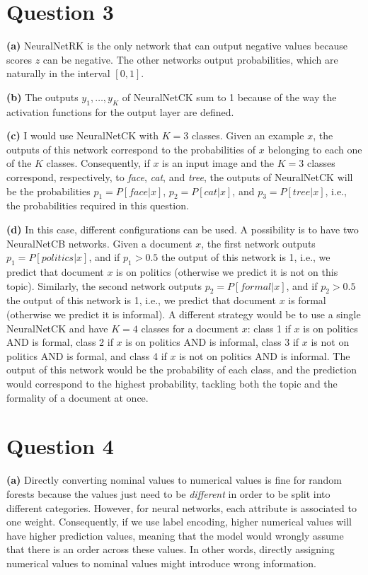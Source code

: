 \documentclass[leqno]{article}
\begin{document}
\hfill
\section*{Question 3} \textbf{(a)} NeuralNetRK is the only network that can output negative values because scores $z$ can be negative. The other 
networks output probabilities, which are naturally in the interval $[0,1]$.

\hfill

\noindent \textbf{(b)} The outputs $y_1, \ldots, y_K$ of NeuralNetCK sum to 1 because of the way the activation functions for the output layer are defined. 

\hfill

\noindent \textbf{(c)} I would use NeuralNetCK with $K = 3$ classes. Given an example $x$, the outputs of this network correspond to the probabilities of $x$ belonging to 
 each one of the $K$ classes. Consequently, if $x$ is an input image and the $K = 3$ classes correspond, respectively, to \textit{face}, \textit{cat}, and \textit{tree}, the 
outputs of NeuralNetCK will be the probabilities $p_1 = P[face|x]$, $p_2 = P[cat|x]$, and $p_3 = P[tree|x]$, i.e., the probabilities required in this question. 

\hfill

\noindent \textbf{(d)} In this case, different configurations can be used. A possibility is to have two NeuralNetCB networks. Given a document $x$, the first 
network outputs $p_1 = P[politics|x]$, and if $p_1 > 0.5$ the output of this network is 1, i.e., we predict that document $x$ is on politics (otherwise we predict it is not 
on this topic). Similarly, the 
second network outputs $p_2 = P[formal|x]$, and if $p_2 > 0.5$ the output of this network is 1, i.e., we predict that document $x$ is formal (otherwise we predict it is 
informal). A different strategy would be to use a single NeuralNetCK and have $K = 4$ classes for a document $x$: class 1 if $x$ is on politics AND is formal, 
class 2 if $x$ is on politics AND is informal, class 3 if $x$ is not on politics AND is formal, and class 4 if $x$ is not on politics AND is informal. The output of this 
network would be the probability of each class, and the prediction would correspond to the highest probability, tackling both the topic and the formality of a document at 
once. 

\hfill

\section*{Question 4} \textbf{(a)} Directly converting nominal values to numerical values is fine for random forests because the values just need to be 
\textit{different} in order to be split into different categories. However, for neural networks, each attribute is associated to one weight. Consequently, 
if we use label encoding, higher numerical values will have higher prediction values, meaning that the model would wrongly assume that there is an order across these 
values. In other words, directly assigning numerical values
to nominal values might introduce wrong information. 
\end{document}
